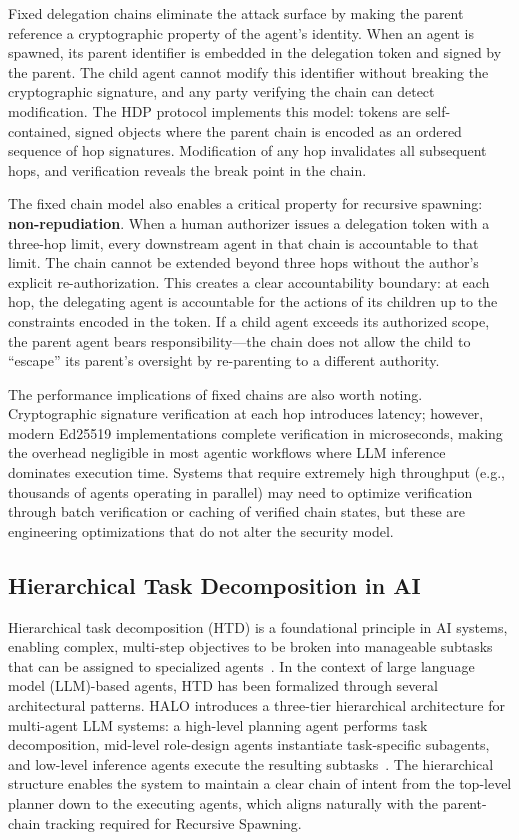 Fixed delegation chains eliminate the attack surface by making the parent reference a cryptographic property of the agent's identity. When an agent is spawned, its parent identifier is embedded in the delegation token and signed by the parent. The child agent cannot modify this identifier without breaking the cryptographic signature, and any party verifying the chain can detect modification. The HDP protocol implements this model: tokens are self-contained, signed objects where the parent chain is encoded as an ordered sequence of hop signatures. Modification of any hop invalidates all subsequent hops, and verification reveals the break point in the chain.

The fixed chain model also enables a critical property for recursive spawning: \textbf{non-repudiation}. When a human authorizer issues a delegation token with a three-hop limit, every downstream agent in that chain is accountable to that limit. The chain cannot be extended beyond three hops without the author's explicit re-authorization. This creates a clear accountability boundary: at each hop, the delegating agent is accountable for the actions of its children up to the constraints encoded in the token. If a child agent exceeds its authorized scope, the parent agent bears responsibility—the chain does not allow the child to ``escape'' its parent's oversight by re-parenting to a different authority.

The performance implications of fixed chains are also worth noting. Cryptographic signature verification at each hop introduces latency; however, modern Ed25519 implementations complete verification in microseconds, making the overhead negligible in most agentic workflows where LLM inference dominates execution time. Systems that require extremely high throughput (e.g., thousands of agents operating in parallel) may need to optimize verification through batch verification or caching of verified chain states, but these are engineering optimizations that do not alter the security model.

\subsection{Hierarchical Task Decomposition in AI}

Hierarchical task decomposition (HTD) is a foundational principle in AI systems, enabling complex, multi-step objectives to be broken into manageable subtasks that can be assigned to specialized agents~\cite{emergentmind_htd}. In the context of large language model (LLM)-based agents, HTD has been formalized through several architectural patterns. HALO introduces a three-tier hierarchical architecture for multi-agent LLM systems: a high-level planning agent performs task decomposition, mid-level role-design agents instantiate task-specific subagents, and low-level inference agents execute the resulting subtasks~\cite{halo_2025}. The hierarchical structure enables the system to maintain a clear chain of intent from the top-level planner down to the executing agents, which aligns naturally with the parent-chain tracking required for Recursive Spawning.


